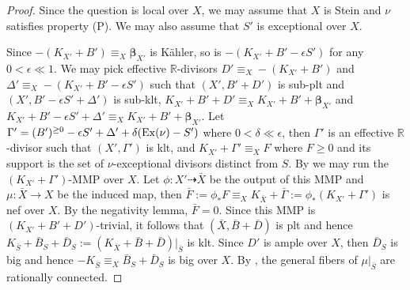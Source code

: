 \documentclass[11pt]{amsart}
\numberwithin{equation}{section}
\def\bbeta{\boldsymbol{\beta}}
\newcommand\R{{\mathbb{R}}}
\theoremstyle{definition}
\theoremstyle{definition}
\newtheorem{lemma}[theorem]{Lemma}
\theoremstyle{definition}
\begin{document}
\begin{proof}  Since the question is local over $X$, we may assume that $X$ is Stein and $\nu$ satisfies property (P). We may also assume that $S'$ is exceptional over $X$.

Since $-(K_{X'}+B')\equiv _X \bbeta _{X'}$ is K\"ahler, so is $-(K_{X'}+B'-\epsilon S')$ for any $0<\epsilon \ll 1$. We may pick effective $\R$-divisors $D'\equiv _X-(K_{X'}+B')$ and $\Delta '\equiv_X -(K_{X'}+B'-\epsilon S')$ such that $(X',B'+D')$ is sub-plt and $(X',B'-\epsilon S'+\Delta ')$ is sub-klt, $K_{X'}+B'+D'\equiv_X K_{X'}+B'+\bbeta _{X'}$ and $K_{X'}+B'-\epsilon S'+\Delta '\equiv_X K_{X'}+B'+\bbeta _{X'}$. 
Let $\Gamma '=(B')^{\geq 0}-\epsilon S'+\Delta '+\delta ({\rm Ex}(\nu)-S')$ where $0<\delta \ll \epsilon$, then $\Gamma'$ is an effective $\R$-divisor such that $(X',\Gamma ')$ is klt, and $K_{X'}+\Gamma'\equiv _XF$ where $F\geq 0$ and its support is the set of $\nu$-exceptional divisors distinct from $S$. 
By \cite{Fuj22} we may run the $(K_{X'}+\Gamma ')$-MMP over $X$. Let $\phi :X'\dasharrow \bar X$ be the output of this MMP and $\mu :\bar X\to X$ be the induced map, then $\bar F:=\phi _*F\equiv _X K_{\bar X}+\bar \Gamma :=\phi _*(K_{X'}+\Gamma ')$ is nef over $X$.
By the negativity lemma, $\bar{F}=0$. Since this MMP is  $(K_{X'}+B'+D')$-trivial, it follows that $(\bar X,\bar B+\bar D)$ is plt and hence $K_{\bar S}+\bar B_S+\bar D_S:=(K_{\bar X}+\bar B+\bar D)|_{\bar S}$ is klt. Since $D'$ is ample over $X$, then $\bar D_S$ is big and hence $-K_{\bar S}\equiv _X\bar B_S+\bar{D}_{S}$ is big over $X$.  By \cite[Corollary 1.4]{HM07}, the  general fibers of $\mu |_{\bar S}$ are rationally connected.
\end{proof}

\end{document}
